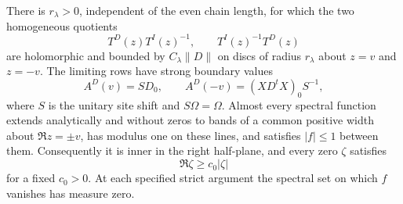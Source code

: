 \begin{lemma}
\label{lem:scalar-continuation}
There is $r_\lambda>0$, independent of the even chain length, for which
the two homogeneous quotients
\[
 T^D(z)T^I(z)^{-1},\qquad T^I(z)^{-1}T^D(z)
\]
are holomorphic and bounded by $C_\lambda\|D\|$ on discs of radius
$r_\lambda$ about $z=v$ and $z=-v$.  The limiting rows have strong
boundary values
\begin{equation}\label{eq:angular-endpoints}
 A^D(v)=SD_0,\qquad
 A^D(-v)=(XD^tX)_0S^{-1},
\end{equation}
where $S$ is the unitary site shift and $S\Omega=\Omega$.
Almost every spectral function extends analytically and without zeros
to bands of a common positive width about $\Re z=\pm v$, has modulus
one on these lines, and satisfies $|f|\le1$ between them.  Consequently
it is inner in the right half-plane, and every zero $\zeta$ satisfies
\begin{equation}\label{eq:angular-cone}
 \Re\zeta\ge c_0|\zeta|
\end{equation}
for a fixed $c_0>0$.  At each specified strict argument the spectral set
on which $f$ vanishes has measure zero.
\end{lemma}

